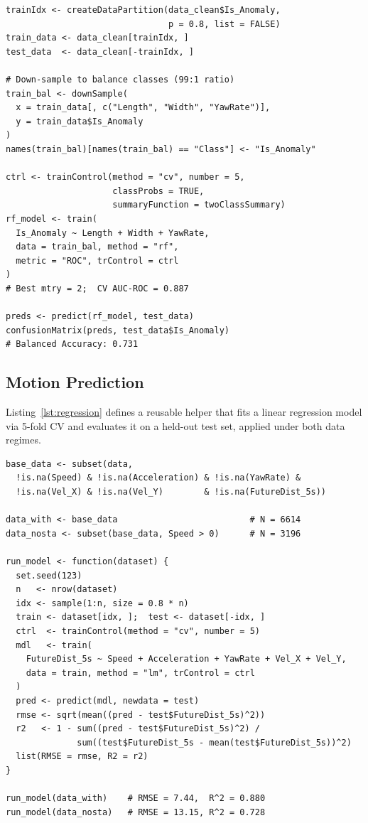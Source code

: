 \documentclass[conference]{IEEEtran}
\begin{document}
\begin{lstlisting}[style=Rstyle, caption={Random Forest classifier with 5-fold CV.}, label={lst:rf}]
trainIdx <- createDataPartition(data_clean$Is_Anomaly,
                                p = 0.8, list = FALSE)
train_data <- data_clean[trainIdx, ]
test_data  <- data_clean[-trainIdx, ]

# Down-sample to balance classes (99:1 ratio)
train_bal <- downSample(
  x = train_data[, c("Length", "Width", "YawRate")],
  y = train_data$Is_Anomaly
)
names(train_bal)[names(train_bal) == "Class"] <- "Is_Anomaly"

ctrl <- trainControl(method = "cv", number = 5,
                     classProbs = TRUE,
                     summaryFunction = twoClassSummary)
rf_model <- train(
  Is_Anomaly ~ Length + Width + YawRate,
  data = train_bal, method = "rf",
  metric = "ROC", trControl = ctrl
)
# Best mtry = 2;  CV AUC-ROC = 0.887

preds <- predict(rf_model, test_data)
confusionMatrix(preds, test_data$Is_Anomaly)
# Balanced Accuracy: 0.731
\end{lstlisting}

\vspace{150px}

\subsection{Motion Prediction}

Listing~\ref{lst:regression} defines a reusable helper that fits a linear regression model via 5-fold CV and evaluates it on a held-out test set, applied under both data regimes.

\begin{lstlisting}[style=Rstyle, caption={Linear regression for 5-second displacement prediction.}, label={lst:regression}]
base_data <- subset(data,
  !is.na(Speed) & !is.na(Acceleration) & !is.na(YawRate) &
  !is.na(Vel_X) & !is.na(Vel_Y)        & !is.na(FutureDist_5s))

data_with <- base_data                          # N = 6614
data_nosta <- subset(base_data, Speed > 0)      # N = 3196

run_model <- function(dataset) {
  set.seed(123)
  n   <- nrow(dataset)
  idx <- sample(1:n, size = 0.8 * n)
  train <- dataset[idx, ];  test <- dataset[-idx, ]
  ctrl  <- trainControl(method = "cv", number = 5)
  mdl   <- train(
    FutureDist_5s ~ Speed + Acceleration + YawRate + Vel_X + Vel_Y,
    data = train, method = "lm", trControl = ctrl
  )
  pred <- predict(mdl, newdata = test)
  rmse <- sqrt(mean((pred - test$FutureDist_5s)^2))
  r2   <- 1 - sum((pred - test$FutureDist_5s)^2) /
              sum((test$FutureDist_5s - mean(test$FutureDist_5s))^2)
  list(RMSE = rmse, R2 = r2)
}

run_model(data_with)    # RMSE = 7.44,  R^2 = 0.880
run_model(data_nosta)   # RMSE = 13.15, R^2 = 0.728
\end{lstlisting}



\end{document}
